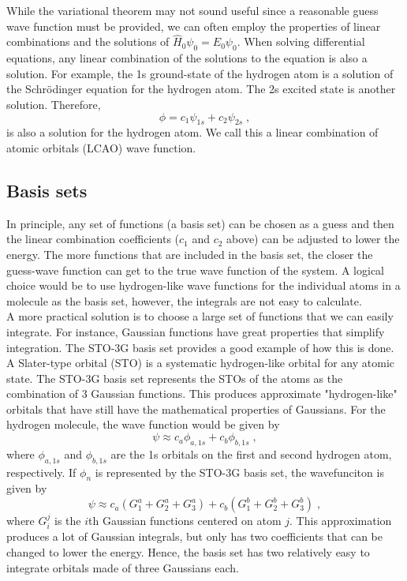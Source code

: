 \documentclass[12pt]{report}
\begin{document}
While the variational theorem may not sound useful since a reasonable guess
wave function must be provided, we can often employ the properties of linear
combinations and the solutions of $\hat H_0\psi_0=E_0\psi_0$.
When solving differential equations, any linear combination of the solutions
to the equation is also a solution.
For example, the 1s ground-state of the hydrogen atom is a solution of the
Schr\"{o}dinger equation for the hydrogen atom.
The 2s excited state is another solution.
Therefore,
\begin{equation}
 \phi = c_1\psi_{1s}+c_2\psi_{2s} \; ,
\end{equation}
is also a solution for the hydrogen atom.
We call this a linear combination of atomic orbitals (LCAO) wave function.

\subsection{Basis sets}

In principle, any set of functions (a basis set) can be chosen as a guess and
then the linear combination coefficients ($c_1$ and $c_2$ above) can be
adjusted to lower the energy.
The more functions that are included in the basis set, the closer the
guess-wave function can get to the true wave function of the system.
A logical choice would be to use hydrogen-like wave functions for the
individual atoms in a molecule as the basis set, however, the integrals are
not easy to calculate. \\

A more practical solution is to choose a large set of functions that we can
easily integrate.
For instance, Gaussian functions have great properties that simplify
integration.
The STO-3G basis set provides a good example of how this is done.
A Slater-type orbital (STO) is a systematic hydrogen-like orbital for any
atomic state.
The STO-3G basis set represents the STOs of the atoms as the combination of 3
Gaussian functions.
This produces approximate "hydrogen-like" orbitals that have still have the
mathematical properties of Gaussians.
For the hydrogen molecule, the wave function would be given by
\begin{equation}
 \psi \approx c_a\phi_{a,1s}+c_b\phi_{b,1s} \; ,
\end{equation}
where $\phi_{a,1s}$ and $\phi_{b,1s}$ are the 1s orbitals on the first and
second hydrogen atom, respectively.
If $\phi_n$ is represented by the STO-3G basis set, the wavefunciton is given
by
\begin{equation}
 \psi \approx c_a(G^a_1+G^a_2+G^a_3)+c_b(G^b_1+G^b_2+G^b_3) \; ,
\end{equation}
where $G^j_i$ is the $i$th Gaussian functions centered on atom $j$.
This approximation produces a lot of Gaussian integrals, but only has two
coefficients that can be changed to lower the energy.
Hence, the basis set has two relatively easy to integrate orbitals made of
three Gaussians each. \\
\end{document}
